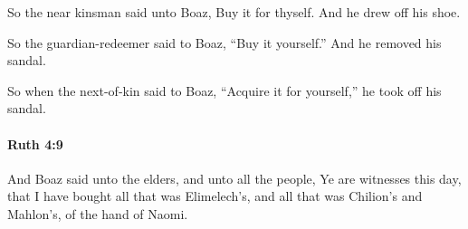 			\begin{versebox}
					\item[BHS] 
					\item[LXX] 
					\item[ASV] So the near kinsman said unto Boaz, Buy it for thyself. And he drew off his shoe.
					\item[NIV] So the guardian-redeemer said to Boaz, “Buy it yourself.” And he removed his sandal.
					\item[NRSV] So when the next-of-kin said to Boaz, “Acquire it for yourself,” he took off his sandal.
			\end{versebox}

		\paragraph{Ruth 4:9} %
			\label{RUTH-4-9}

			And Boaz said unto the elders, and unto all the people, Ye are witnesses this day, that I have bought all that was Elimelech’s, and all that was Chilion’s and Mahlon’s, of the hand of Naomi.

